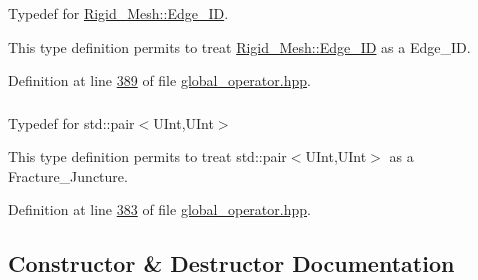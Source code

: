 Typedef for \hyperlink{classFVCode3D_1_1Rigid__Mesh_1_1Edge__ID}{Rigid\+\_\+\+Mesh\+::\+Edge\+\_\+\+ID}. 

This type definition permits to treat \hyperlink{classFVCode3D_1_1Rigid__Mesh_1_1Edge__ID}{Rigid\+\_\+\+Mesh\+::\+Edge\+\_\+\+ID} as a Edge\+\_\+\+ID. 

Definition at line \hyperlink{global__operator_8hpp_source_l00389}{389} of file \hyperlink{global__operator_8hpp_source}{global\+\_\+operator.\+hpp}.

\subsubsection[{\texorpdfstring{Fracture\+\_\+\+Juncture}{Fracture_Juncture}}]{\hspace{0.3cm}{\ttfamily [private]}}\hypertarget{classFVCode3D_1_1FluxOperator_ab9fef691b58bb04de5814d21fb59ef44}{}\label{classFVCode3D_1_1FluxOperator_ab9fef691b58bb04de5814d21fb59ef44}


Typedef for std\+::pair$<$\+U\+Int,\+U\+Int$>$ 

This type definition permits to treat std\+::pair$<$\+U\+Int,\+U\+Int$>$ as a Fracture\+\_\+\+Juncture. 

Definition at line \hyperlink{global__operator_8hpp_source_l00383}{383} of file \hyperlink{global__operator_8hpp_source}{global\+\_\+operator.\+hpp}.



\subsection{Constructor \& Destructor Documentation}
